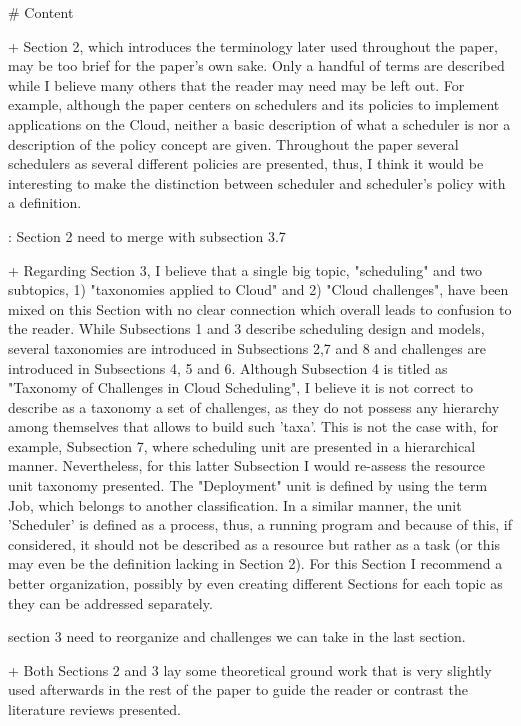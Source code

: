 # Content

+ Section 2, which introduces the terminology later used throughout the paper, may be too brief for the paper's own sake. Only a handful of terms are described while I believe many others that the reader may need may be left out. For example, although the paper centers on schedulers and its policies to implement applications on the Cloud, neither a basic description of what a scheduler is nor a description of the policy concept are given. Throughout the paper several schedulers as several different policies are presented, thus, I think it would be interesting to make the distinction between scheduler and scheduler's policy with a definition.


\reply: Section 2  need to merge with subsection 3.7 

+ Regarding Section 3, I believe that a single big topic, "scheduling" and two subtopics, 1) "taxonomies applied to Cloud" and 2) "Cloud challenges", have been mixed on this Section with no clear connection which overall leads to confusion to the reader. While Subsections 1 and 3 describe scheduling design and models, several taxonomies are introduced in Subsections 2,7 and 8 and challenges are introduced in Subsections 4, 5 and 6. Although Subsection 4 is titled as "Taxonomy of Challenges in Cloud Scheduling", I believe it is not correct to describe as a taxonomy a set of challenges, as they do not possess any hierarchy among themselves that allows to build such 'taxa'. This is not the case with, for example, Subsection 7, where scheduling unit are presented in a hierarchical manner. Nevertheless, for this latter Subsection I would re-assess the resource unit taxonomy presented. The "Deployment" unit is defined by using the term Job, which belongs to another classification. In a similar manner, the unit 'Scheduler' is defined as a process, thus, a running program and because of this, if considered, it should not be described as a resource but rather as a task (or this may even be the definition lacking in Section 2). For this Section I recommend a better organization, possibly by even creating different Sections for each topic as they can be addressed separately.

\reply section 3 need to reorganize and challenges we can take in the last section. 

+ Both Sections 2 and 3 lay some theoretical ground work that is very slightly used afterwards in the rest of the paper to guide the reader or contrast the literature reviews presented.


